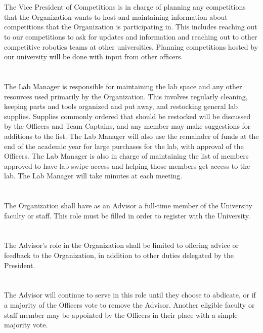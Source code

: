 \documentclass[12pt]{cls/constitution}
\begin{document}
\section{}
The Vice President of Competitions is in charge of planning any competitions that the Organization wants to host and maintaining information about competitions that the Organization is participating in. This includes reaching out to our competitions to ask for updates and information and reaching out to other competitive robotics teams at other universities. Planning competitions hosted by our university will be done with input from other officers.  

\section{}
The Lab Manager is responsible for maintaining the lab space and any other resources used primarily by the Organization. This involves regularly cleaning, keeping parts and tools organized and put away, and restocking general lab supplies. Supplies commonly ordered that should be restocked will be discussed by the Officers and Team Captains, and any member may make suggestions for additions to the list. The Lab Manager will also use the remainder of funds at the end of the academic year for large purchases for the lab, with approval of the Officers. The Lab Manager is also in charge of maintaining the list of members approved to have lab swipe access and helping those members get access to the lab. The Lab Manager will take minutes at each meeting.  

\section{}
The Organization shall have as an Advisor a full-time member of the University faculty or staff. This role must be filled in order to register with the University.

\section{}
The Advisor’s role in the Organization shall be limited to offering advice or feedback to the Organization, in addition to other duties delegated by the President.

\section{}
The Advisor will continue to serve in this role until they choose to abdicate, or if a majority of the Officers vote to remove the Advisor. Another eligible faculty or staff member may be appointed by the Officers in their place with a simple majority vote.
\end{document}

